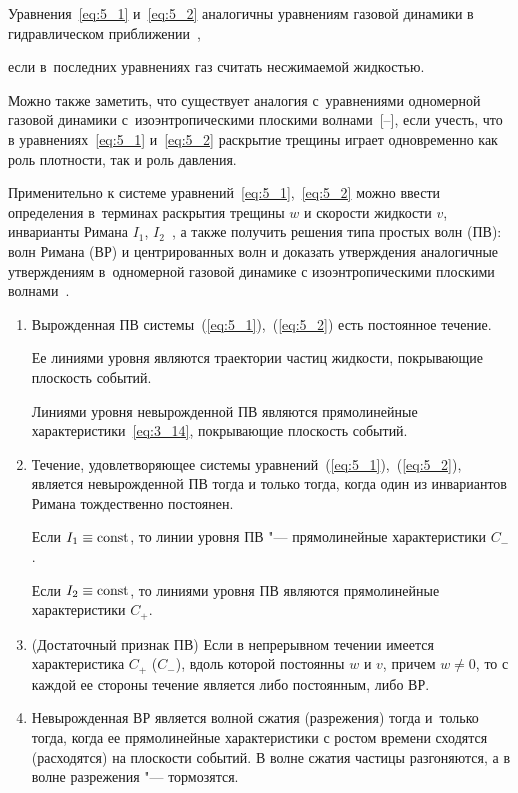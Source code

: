 Уравнения~\eqref{eq:5_1}  и~\eqref{eq:5_2} аналогичны уравнениям газовой динамики в гидравлическом приближении~\cite{Zver_smirn1}, 

если в~последних уравнениях газ считать несжимаемой жидкостью. 

Можно также заметить, что существует аналогия с~уравнениями одномерной газовой динамики с~изоэнтропическими плоскими волнами~[--], если учесть, что в уравнениях~\eqref{eq:5_1} и~\eqref{eq:5_2} раскрытие трещины играет одновременно как роль плотности, так и роль давления. 

Применительно к системе уравнений~\eqref{eq:5_1},~\eqref{eq:5_2} можно ввести определения в~терминах раскрытия трещины $w$ и скорости жидкости $v$, инварианты Римана $I_1$, $I_2$~\cite{pedli1}, а также получить решения типа простых волн (ПВ): волн Римана (ВР) и центрированных волн и доказать утверждения аналогичные утверждениям в~одномерной газовой динамике с изоэнтропическими плоскими  волнами~\cite{ovsyan1}.



\begin{enumerate}

	\item[1.] Вырожденная ПВ системы~(\ref{eq:5_1}),~(\ref{eq:5_2}) есть постоянное течение. 

	Ее линиями уровня являются траектории частиц жидкости, покрывающие плоскость событий. 

	Линиями уровня невырожденной ПВ являются прямолинейные характеристики~\eqref{eq:3_14}, покрывающие плоскость событий.

	\item[2.] Течение, удовлетворяющее системы уравнений~(\ref{eq:5_1}),~(\ref{eq:5_2}), является невырожденной ПВ тогда и только тогда, когда один из инвариантов Римана тождественно постоянен. 

	Если $I_1 \equiv \rm const$, то линии уровня ПВ "--- прямолинейные характеристики $C_{-}$. 

	Если $I_2 \equiv \rm const$, то линиями уровня ПВ являются прямолинейные характеристики $C_{+}$.

	\item[3.] (Достаточный признак ПВ) Если в непрерывном течении имеется характеристика $C_+$ ($C_-$), вдоль которой постоянны $w$ и $v$, причем ${w \neq 0}$, то с каждой ее стороны течение является либо постоянным, либо ВР.

	

	\item[4.] Невырожденная ВР является волной сжатия (разрежения) тогда и~только тогда, когда ее прямолинейные характеристики с ростом времени сходятся (расходятся) на плоскости событий. В волне сжатия частицы разгоняются, а в волне разрежения "--- тормозятся.

\end{enumerate}



